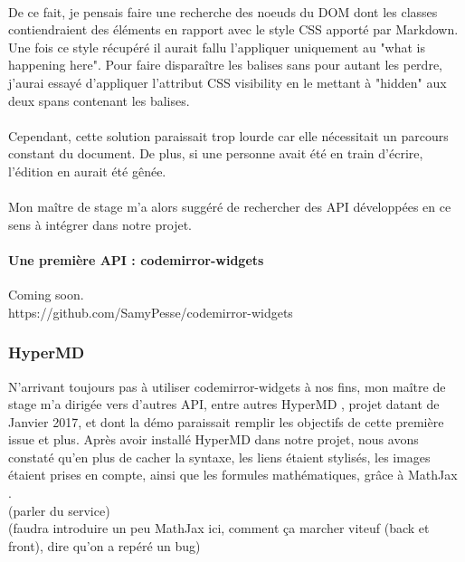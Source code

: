 \documentclass[12pt]{article}
\begin{document}
\paragraph{}
De ce fait, je pensais faire une recherche des noeuds du DOM dont les classes contiendraient des éléments en rapport avec le style CSS apporté par Markdown. Une fois ce style récupéré il aurait fallu l'appliquer uniquement au "what is happening here". Pour faire disparaître les balises sans pour autant les perdre, j'aurai essayé d'appliquer l'attribut CSS visibility en le mettant à "hidden" aux deux spans contenant les balises.
\paragraph{}
Cependant, cette solution paraissait trop lourde car elle nécessitait un parcours constant du document. De plus, si une personne avait été en train d'écrire, l'édition en aurait été gênée.

\paragraph{}
Mon maître de stage m'a alors suggéré de rechercher des API développées en ce sens à intégrer dans notre projet.

\paragraph{Une première API : codemirror-widgets}
Coming soon.\\
https://github.com/SamyPesse/codemirror-widgets


\subsubsection{HyperMD}
N'arrivant toujours pas à utiliser codemirror-widgets à nos fins, mon maître de stage m'a dirigée vers d'autres API, entre autres HyperMD \cite{hypermd}, projet datant de Janvier 2017, et dont la démo \cite{demo} paraissait remplir les objectifs de cette première issue et plus.
Après avoir installé HyperMD dans notre projet, nous avons constaté qu'en plus de cacher la syntaxe, les liens étaient stylisés, les images étaient prises en compte, ainsi que les formules mathématiques, grâce à MathJax \cite{mathjax}.\\

(parler du service)\\
(faudra introduire un peu MathJax ici, comment ça marcher viteuf (back et front), dire qu'on a repéré un bug)\\
\end{document}
